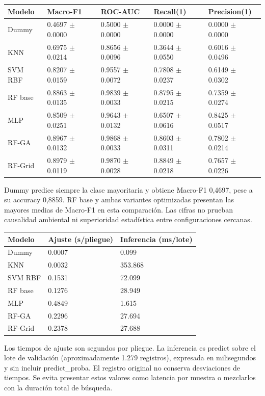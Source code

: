 \documentclass[12pt,a4paper]{article}
\begin{document}
{\small\begin{tabularx}{\textwidth}{XXXXX}
\toprule
Modelo & Macro-F1 & ROC-AUC & Recall(1) & Precision(1) \\
\midrule
Dummy & 0.4697 $\pm$ 0.0000 & 0.5000 $\pm$ 0.0000 & 0.0000 $\pm$ 0.0000 & 0.0000 $\pm$ 0.0000 \\
KNN & 0.6975 $\pm$ 0.0214 & 0.8656 $\pm$ 0.0096 & 0.3644 $\pm$ 0.0550 & 0.6016 $\pm$ 0.0496 \\
SVM RBF & 0.8207 $\pm$ 0.0159 & 0.9557 $\pm$ 0.0072 & 0.7808 $\pm$ 0.0237 & 0.6149 $\pm$ 0.0302 \\
RF base & 0.8863 $\pm$ 0.0135 & 0.9839 $\pm$ 0.0033 & 0.8795 $\pm$ 0.0215 & 0.7359 $\pm$ 0.0274 \\
MLP & 0.8509 $\pm$ 0.0251 & 0.9643 $\pm$ 0.0132 & 0.6507 $\pm$ 0.0616 & 0.8425 $\pm$ 0.0517 \\
RF-GA & 0.8967 $\pm$ 0.0132 & 0.9868 $\pm$ 0.0033 & 0.8603 $\pm$ 0.0311 & 0.7802 $\pm$ 0.0214 \\
RF-Grid & 0.8979 $\pm$ 0.0119 & 0.9870 $\pm$ 0.0028 & 0.8849 $\pm$ 0.0218 & 0.7657 $\pm$ 0.0226 \\
\bottomrule\end{tabularx}}

Dummy predice siempre la clase mayoritaria y obtiene Macro-F1 0,4697, pese a su accuracy 0,8859. RF base y ambas variantes optimizadas presentan las mayores medias de Macro-F1 en esta comparación. Las cifras no prueban causalidad ambiental ni superioridad estadística entre configuraciones cercanas.

{\small\begin{tabularx}{\textwidth}{XXX}
\toprule
Modelo & Ajuste (s/pliegue) & Inferencia (ms/lote) \\
\midrule
Dummy & 0.0007 & 0.099 \\
KNN & 0.0032 & 353.868 \\
SVM RBF & 0.1531 & 72.099 \\
RF base & 0.1276 & 28.949 \\
MLP & 0.4849 & 1.615 \\
RF-GA & 0.2296 & 27.694 \\
RF-Grid & 0.2378 & 27.688 \\
\bottomrule\end{tabularx}}

Los tiempos de ajuste son segundos por pliegue. La inferencia es predict sobre el lote de validación (aproximadamente 1.279 registros), expresada en milisegundos y sin incluir predict\_proba. El registro original no conserva desviaciones de tiempos. Se evita presentar estos valores como latencia por muestra o mezclarlos con la duración total de búsqueda.
\end{document}
